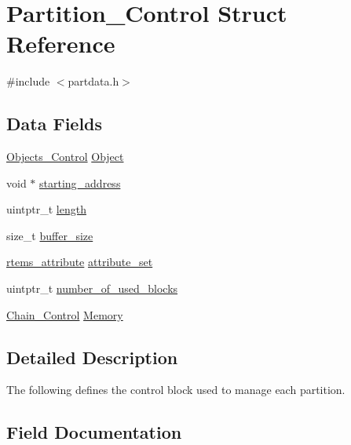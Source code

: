\hypertarget{structPartition__Control}{}\section{Partition\+\_\+\+Control Struct Reference}
\label{structPartition__Control}


{\ttfamily \#include $<$partdata.\+h$>$}

\subsection*{Data Fields}
\begin{DoxyCompactItemize}
\item 
\mbox{\hyperlink{structObjects__Control}{Objects\+\_\+\+Control}} \mbox{\hyperlink{structPartition__Control_afeba3e9a7a011daabfd83cf2f501afa6}{Object}}
\item 
void $\ast$ \mbox{\hyperlink{structPartition__Control_aefba6f99c4a1747dde63708ca0df7fbb}{starting\+\_\+address}}
\item 
uintptr\+\_\+t \mbox{\hyperlink{structPartition__Control_a8c76fab1a9ac8f5ecc56956be0a0adf1}{length}}
\item 
size\+\_\+t \mbox{\hyperlink{structPartition__Control_ab265b9126c5c76e1bd70adbeb15b7605}{buffer\+\_\+size}}
\item 
\mbox{\hyperlink{group__ClassicAttributes_gaea40313cf78ed843e09c4315d0a10f79}{rtems\+\_\+attribute}} \mbox{\hyperlink{structPartition__Control_a194df879300c22d8e3e28e85d3b86aad}{attribute\+\_\+set}}
\item 
uintptr\+\_\+t \mbox{\hyperlink{structPartition__Control_a7379b6a5aeb440a8618573b6d63eb620}{number\+\_\+of\+\_\+used\+\_\+blocks}}
\item 
\mbox{\hyperlink{unionChain__Control}{Chain\+\_\+\+Control}} \mbox{\hyperlink{structPartition__Control_ab284c18e4197f603951ede02b7e25c03}{Memory}}
\end{DoxyCompactItemize}


\subsection{Detailed Description}
The following defines the control block used to manage each partition. 

\subsection{Field Documentation}
\mbox{\label{structPartition__Control_a194df879300c22d8e3e28e85d3b86aad}} 
